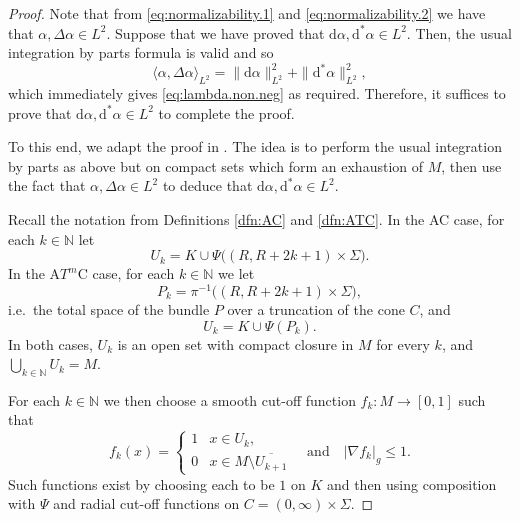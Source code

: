 \documentclass{article}
\theoremstyle{definition}
\numberwithin{thm}{section}
\numberwithin{equation}{section}
\def\N{\mathbb{N}}
\def\d{\mathrm{d}}
\begin{document}
\begin{proof}
Note that from \eqref{eq:normalizability.1} and \eqref{eq:normalizability.2} we have that $\alpha,\Delta\alpha\in L^2$.  Suppose that we have proved that $\d\alpha,\d^*\alpha\in L^2$.  Then, the usual integration by parts formula is valid and so
\begin{equation}
\langle\alpha,\Delta\alpha\rangle_{L^2}=\|\d\alpha\|_{L^2}^2+\|\d^*\alpha\|_{L^2}^2,
\end{equation}
which immediately gives \eqref{eq:lambda.non.neg} as required.  Therefore, it suffices to prove that $\d\alpha,\d^*\alpha\in L^2$ to complete the proof.

To this end, we adapt the proof in \cite[pp.~340--341]{Karp}.   The idea is to perform the usual integration by parts as above but on compact sets which form an exhaustion of $M$, then use the fact that $\alpha,\Delta\alpha\in L^2$ to deduce that $\d\alpha,\d^*\alpha\in L^2$.

Recall the notation from Definitions \ref{dfn:AC} and \ref{dfn:ATC}.  In the AC case, for each $k\in\N$ let \begin{equation} 
U_k=K\cup \Psi\big((R,R+2k+1)\times\Sigma\big).
\end{equation}
In the A$T^m$C case, for each $k\in\N$ we let 
\begin{equation}
    P_k=\pi^{-1}\big((R,R+2k+1)\times\Sigma\big),
\end{equation}
i.e.~the total space of the bundle $P$ over a truncation of the cone $C$, and
\begin{equation}
    U_k=K\cup \Psi(P_k).
\end{equation}
In both cases, $U_k$ is an open set with compact closure in $M$ for every $k$, and $\bigcup_{k\in \N}U_k=M$.  

For each $k\in\N$ we then choose a smooth cut-off function $f_k:M\to [0,1]$ such that 
\begin{equation}
    f_k(x)=\left\{\begin{array}{cl} 1 & x\in U_k, \\
    0 & x\in  M\setminus\overline{U_{k+1}}
    \end{array}\right.\quad\text{and}\quad |\nabla f_k|_g\leq 1.
\end{equation}
Such functions exist by choosing each to be $1$ on $K$ and then using composition with $\Psi$ and radial cut-off functions on $C=(0,\infty)\times\Sigma$. 


\end{proof}
\end{document}
